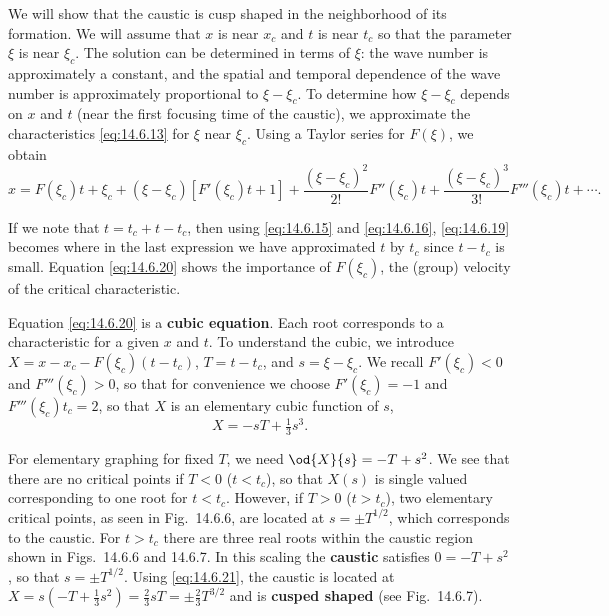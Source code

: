 We will show that the caustic is cusp shaped in the neighborhood of its formation.  We will assume that $x$ is near $x_c$ and $t$ is near $t_c$ so that the parameter $\xi$ is near $\xi_c$.  The solution can be determined in terms of $\xi$:  the wave number is approximately a constant, and the spatial and temporal dependence of the wave number is approximately proportional to $\xi - \xi_c$.  To determine how $\xi - \xi_c$ depends on $x$ and $t$ (near the first focusing time of the caustic), we approximate the characteristics \eqref{eq:14.6.13} for $\xi$ near $\xi_c$.  Using a Taylor series for $F(\xi)$, we obtain
\begin{equation}
\label{eq:14.6.19}
x = F(\xi_c)t + \xi_c + (\xi - \xi_c)[F'(\xi_c)t + 1] + \frac{(\xi-\xi_c)^2}{2!}F''(\xi_c)t + \frac{(\xi-\xi_c)^3}{3!}F'''(\xi_c)t + \cdots.
\end{equation}

If we note that $t = t_c + t - t_c$, then using \eqref{eq:14.6.15} and \eqref{eq:14.6.16}, \eqref{eq:14.6.19} becomes
where in the last expression we have approximated $t$ by $t_c$ since $t - t_c$ is small.  Equation \eqref{eq:14.6.20} shows the importance of $F(\xi_c)$, the (group) velocity of the critical characteristic.

Equation \eqref{eq:14.6.20} is a \textbf{cubic equation}.  Each root corresponds to a characteristic for a given $x$ and $t$.  To understand the cubic, we introduce $X = x - x_c - F(\xi_c)(t - t_c)$, $T = t - t_c$, and $s = \xi - \xi_c$.  We recall $F'(\xi_c) < 0$ and $F'''(\xi_c) > 0$, so that for convenience we choose $F'(\xi_c) = -1$ and $F'''(\xi_c)t_c = 2$, so that $X$ is an elementary cubic function of $s$,
\begin{equation}
\label{eq:14.6.21}
X = -sT + \tfrac{1}{3}s^3.
\end{equation}

For elementary graphing for fixed $T$, we need $\od{X}{s} = -T + s^2$.  We see that there are no critical points if $T < 0$ ($t < t_c$), so that $X(s)$ is single valued corresponding to one root for $t < t_c$.  However, if $T > 0$ ($t > t_c$), two elementary critical points, as seen in Fig.~14.6.6, are located at $s = \pm T^{1/2}$, which corresponds to the caustic.  For $t > t_c$ there are three real roots within the caustic region shown in Figs.~14.6.6 and 14.6.7.  In this scaling the \textbf{caustic} satisfies $0 = -T + s^2$, so that $s = \pm T^{1/2}$.  Using \eqref{eq:14.6.21}, the caustic is located at $X = s(-T + \frac{1}{3}s^2) = \frac{2}{3}sT = \pm\frac{2}{3}T^{3/2}$ and is \textbf{cusped shaped} (see Fig.~14.6.7).

